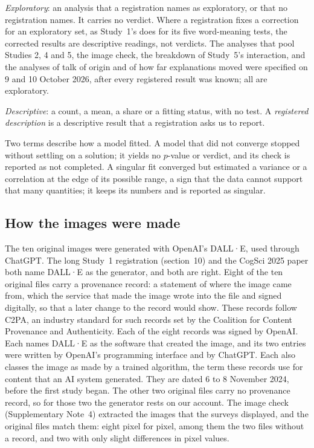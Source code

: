 \emph{Exploratory}: an analysis that a registration names as exploratory, or that no registration names. It carries no verdict. Where a registration fixes a correction for an exploratory set, as Study~1's does for its five word-meaning tests, the corrected results are descriptive readings, not verdicts. The analyses that pool Studies 2, 4 and 5, the image check, the breakdown of Study~5's interaction, and the analyses of talk of origin and of how far explanations moved were specified on 9 and 10 October 2026, after every registered result was known; all are exploratory.

\emph{Descriptive}: a count, a mean, a share or a fitting status, with no test. A \emph{registered description} is a descriptive result that a registration asks us to report.

Two terms describe how a model fitted. A model that did not converge stopped without settling on a solution; it yields no $p$-value or verdict, and its check is reported as not completed. A singular fit converged but estimated a variance or a correlation at the edge of its possible range, a sign that the data cannot support that many quantities; it keeps its numbers and is reported as singular.

\subsection*{How the images were made}

The ten original images were generated with OpenAI's DALL·E, used through ChatGPT. The long Study~1 registration (section~10) and the CogSci 2025 paper both name DALL·E as the generator, and both are right.\cite{kamper2025originalsin} Eight of the ten original files carry a provenance record: a statement of where the image came from, which the service that made the image wrote into the file and signed digitally, so that a later change to the record would show. These records follow C2PA, an industry standard for such records set by the Coalition for Content Provenance and Authenticity. Each of the eight records was signed by OpenAI. Each names DALL·E as the software that created the image, and its two entries were written by OpenAI's programming interface and by ChatGPT. Each also classes the image as made by a trained algorithm, the term these records use for content that an AI system generated. They are dated 6 to 8 November 2024, before the first study began. The other two original files carry no provenance record, so for those two the generator rests on our account. The image check (Supplementary Note~4) extracted the images that the surveys displayed, and the original files match them: eight pixel for pixel, among them the two files without a record, and two with only slight differences in pixel values.

